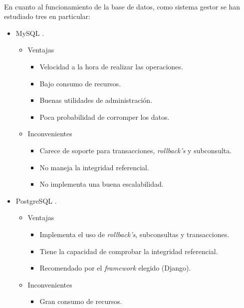    \paragraph{}En cuanto al funcionamiento de la base de datos, como sistema
   gestor se han estudiado tres en particular:

   \begin{itemize}
    \item MySQL \cite{mysql}.
      \begin{itemize}
         \item Ventajas
            \begin{itemize}
             \item Velocidad a la hora de realizar las operaciones.
             \item Bajo consumo de recursos.
             \item Buenas utilidades de administración.
             \item Poca probabilidad de corromper los datos.
            \end{itemize}
         \item Inconvenientes
            \begin{itemize}
             \item Carece de soporte para transacciones, \textit{rollback's} y
                   subconsulta.
             \item No maneja la integridad referencial.
             \item No implementa una buena escalabilidad.
            \end{itemize}
      \end{itemize}
    \item PostgreSQL \cite{postgresql}.
      \begin{itemize}
         \item Ventajas
            \begin{itemize}
             \item Implementa el uso de \textit{rollback's}, subconsultas y
                   transacciones.
             \item Tiene la capacidad de comprobar la integridad referencial.
             \item Recomendado por el \textit{framework} elegido (Django).
            \end{itemize}
         \item Inconvenientes
            \begin{itemize}
             \item Gran consumo de recursos.

\end{itemize}
\end{itemize}
\end{itemize}
